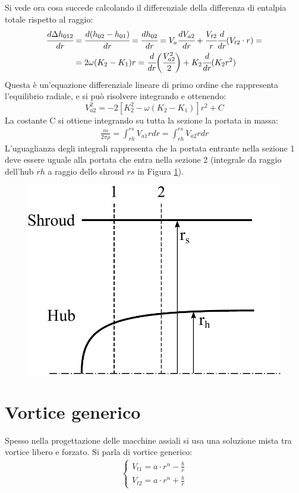 Si vede ora cosa succede calcolando il differenziale della differenza di entalpia totale rispetto al raggio:
\begin{align*}
\begin{split}
\cfrac{d \Delta h_{012}}{dr} &= \cfrac{d ( h_{02}-h_{01})}{dr} = \cfrac{dh_{02}}{dr} = V_a \cfrac{dV_{a2}}{dr} + \cfrac{V_{t2}}{r} \cfrac{d}{dr} (V_{t2} \cdot r) = \\
& =2 \omega (K_2 - K_1) r = \cfrac{d}{dr} \bigg( \cfrac{V_{a2}^2}{2} \bigg) + K_2 \cfrac{d}{dr} (K_2 r^2)
\end{split}
\end{align*}
Questa è un'equazione differenziale lineare di primo ordine che rappresenta l'equilibrio radiale, e si può risolvere integrando e ottenendo:
\begin{equation}
\boxed{V_{a2}^2 = -2 \left[ K_2^2 - \omega \left( K_2 - K_1 \right) \right] r^2 + C}
\label{eq:valleVorticeForzato}
\end{equation}
La costante C si ottiene integrando su tutta la sezione la portata in massa:
\begin{align*}
\frac{\dot{m}}{2 \pi \rho} = \int_{rh}^{rs} V_{a1} r dr = \int_{rh}^{rs} V_{a2} r dr
\end{align*}
L'uguaglianza degli integrali rappresenta che la portata entrante nella sezione 1 deve essere uguale alla portata che entra nella sezione 2 (integrale da raggio dell'hub $rh$ a raggio dello shroud $rs$ in Figura \ref{fig:hubshroud}).
\begin{figure}[h]
\centering
  \includegraphics[width=.4\textwidth]{fig/HubShroud.pdf}
\caption{}
\label{fig:hubshroud}
\end{figure}
\section{Vortice generico}
Spesso nella progettazione delle macchine assiali si usa una soluzione mista tra vortice libero e forzato. Si parla di vortice generico:
\begin{align*}
\boxed{
\begin{cases}
V_{t1} = a \cdot r^n - \frac{b}{r}\\
V_{t2} = a \cdot r^n + \frac{b}{r}
\end{cases}}
\end{align*}

